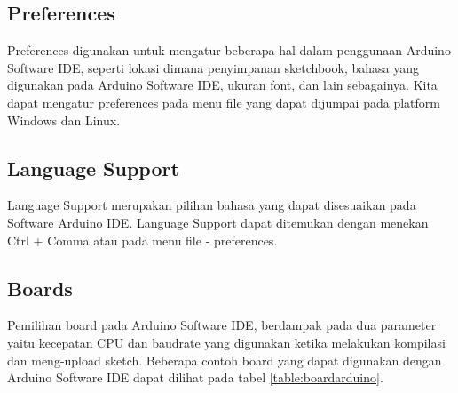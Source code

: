 \subsection{Preferences}
Preferences digunakan untuk mengatur beberapa hal dalam penggunaan Arduino Software IDE, seperti lokasi dimana penyimpanan sketchbook, bahasa yang digunakan pada Arduino Software IDE, ukuran font, dan lain sebagainya. Kita dapat mengatur preferences pada menu file yang dapat dijumpai pada platform Windows dan Linux.

\subsection{Language Support}
Language Support merupakan pilihan bahasa yang dapat disesuaikan pada Software Arduino IDE. Language Support dapat ditemukan dengan menekan Ctrl + Comma atau pada menu file - preferences.

\subsection{Boards}
Pemilihan board pada Arduino Software IDE, berdampak pada dua parameter yaitu kecepatan CPU dan baudrate yang digunakan ketika melakukan kompilasi dan meng-upload sketch. Beberapa contoh board yang dapat digunakan dengan Arduino Software IDE dapat dilihat pada tabel \ref{table:boardarduino}.





